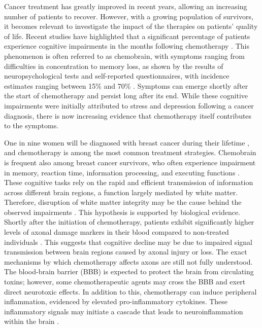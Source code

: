 \vspace{1\baselineskip}
Cancer treatment has greatly improved in recent years, allowing an increasing number of patients to recover. However, with a growing population of survivors, it becomes relevant to investigate the impact of the therapies on patients' quality of life.
Recent studies have highlighted that a significant percentage of patients experience cognitive impairments in the months following chemotherapy \cite{Matsos2017}. This phenomenon is often referred to as chemobrain, with symptoms ranging from difficulties in concentration to memory loss, as shown by the results of neuropsychological tests and self-reported questionnaires, with incidence estimates ranging between 15\% and 70\% \cite{Meyers2008}. Symptoms can emerge shortly after the start of chemotherapy and persist long after its end. While these cognitive impairments were initially attributed to stress and depression following a cancer diagnosis, there is now increasing evidence that chemotherapy itself contributes to the symptoms.

One in nine women will be diagnosed with breast cancer during their lifetime \cite{Sung2021}, and chemotherapy is among the most common treatment strategies. Chemobrain is frequent also among breast cancer survivors, who often experience impairment in memory, reaction time, information processing, and executing functions \cite{Chen2020}. These cognitive tasks rely on the rapid and efficient transmission of information across different brain regions, a function largely mediated by white matter. Therefore, disruption of white matter integrity may be the cause behind the observed impairments \cite{Deprez2011}.
This hypothesis is supported by biological evidence. Shortly after the initiation of chemotherapy, patients exhibit significantly higher levels of axonal damage markers in their blood compared to non-treated individuals \cite{Schroyen2021}. This suggests that cognitive decline may be due to impaired signal transmission between brain regions caused by axonal injury or loss.
The exact mechanisms by which chemotherapy affects axons are still not fully understood. The blood-brain barrier (BBB) is expected to protect the brain from circulating toxins; however, some chemotherapeutic agents may cross the BBB and exert direct neurotoxic effects. In addition to this, chemotherapy can induce peripheral inflammation, evidenced by elevated pro-inflammatory cytokines. These inflammatory signals may initiate a cascade that leads to neuroinflammation within the brain \cite{Schroyen2021}.

